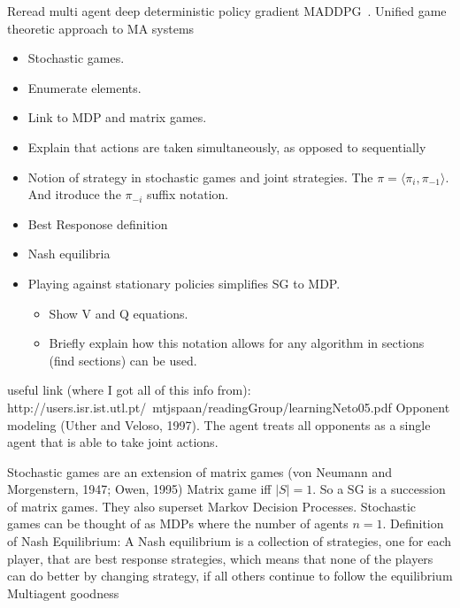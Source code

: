\documentclass{../main.tex}{}
\begin{document}
Reread multi agent deep deterministic policy gradient MADDPG~\cite{Lowe2017}. Unified game theoretic approach to MA systems~\citep{Lanctot2017}

\begin{itemize}
\item Stochastic games.
\item Enumerate elements.
\item Link to MDP and matrix games.
\item Explain that actions are taken simultaneously, as opposed to sequentially
\item Notion of strategy in stochastic games and joint strategies. The $ \pi = \langle \pi_i, \pi_{-1} \rangle $. And itroduce the $\pi_{-i}$ suffix notation.
\item Best Responose definition
\item Nash equilibria
\item Playing against stationary policies simplifies SG to MDP.%
    \begin{itemize}
    \item Show V and Q equations.
    \item Briefly explain how this notation allows for any algorithm in sections (find sections) can be used.
    \end{itemize}
\end{itemize}

useful link (where I got all of this info from): http://users.isr.ist.utl.pt/~mtjspaan/readingGroup/learningNeto05.pdf
Opponent modeling (Uther and Veloso, 1997). The agent treats all opponents as a single agent that is able to take joint actions.

Stochastic games are an extension of matrix games  (von Neumann and Morgenstern, 1947; Owen, 1995) Matrix game iff $\mid S \mid = 1$. So a SG is a succession of matrix games. They also superset Markov Decision Processes. Stochastic games can be thought of as MDPs where the number of agents $n = 1$. 
Definition of Nash Equilibrium: A Nash equilibrium is a collection of strategies, one for each player, that are best response strategies, which means that none of the players can do better by changing strategy, if all others continue to follow the equilibrium
Multiagent goodness
\end{document}

